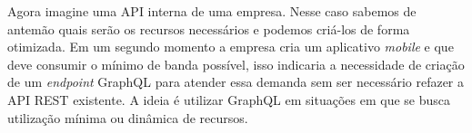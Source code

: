 Agora imagine uma API interna de uma empresa. Nesse caso sabemos de
antemão quais serão os recursos necessários e podemos criá-los de forma
otimizada. Em um segundo momento a empresa cria um aplicativo
\emph{mobile} e que deve consumir o mínimo de banda possível, isso
indicaria a necessidade de criação de um \emph{endpoint} GraphQL para
atender essa demanda sem ser necessário refazer a API REST existente. A
ideia é utilizar GraphQL em situações em que se busca utilização mínima
ou dinâmica de recursos.

